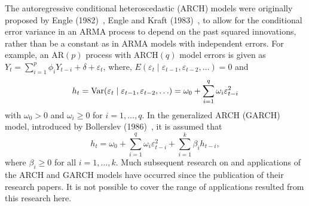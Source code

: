 The autoregressive conditional heteroscedastic (ARCH) models were originally proposed by Engle (1982)~\cite{engle1982}, Engle and Kraft (1983)~\cite{engle1983}, to allow for the conditional error variance in an ARMA process to depend on the past squared innovations, rather than be a constant as in ARMA models with independent errors. For example, an AR$(p)$ process with ARCH$(q)$ model errors is given as $Y_t = \sum_{i=1}^p\phi_iY_{t-i} + \delta + \varepsilon_t$, where, $E(\varepsilon_t \;|\; \varepsilon_{t-1},\varepsilon_{t-2},\ldots)= 0$ and
	\begin{equation} \label{eqn:2ht}
	h_t= \var(\varepsilon_t \;|\; \varepsilon_{t-1}, \varepsilon_{t-2}, \ldots) = \omega_0 + \sum_{i=1}^q \omega_i \varepsilon_{t-i}^2
	\end{equation}
with $\omega_0 > 0$ and $\omega_i \geq 0$ for $i= 1, \ldots, q$. In the generalized ARCH (GARCH) model, introduced by Bollerslev (1986)~\cite{bollerslev1986}, it is assumed that
	\begin{equation} \label{eqn:2secondht}
	h_t = \omega_0 + \sum_{i=1}^q \omega_i \varepsilon_{t-i}^2 + \sum_{i=1}^k \beta_i h_{t-i},
	\end{equation}
where $\beta_i \geq 0$ for all $i = 1,\ldots,k$. Much subsequent research on and applications of the ARCH and GARCH models have occurred since the publication of their research papers. It is not possible to cover the range of applications resulted from this research here.


